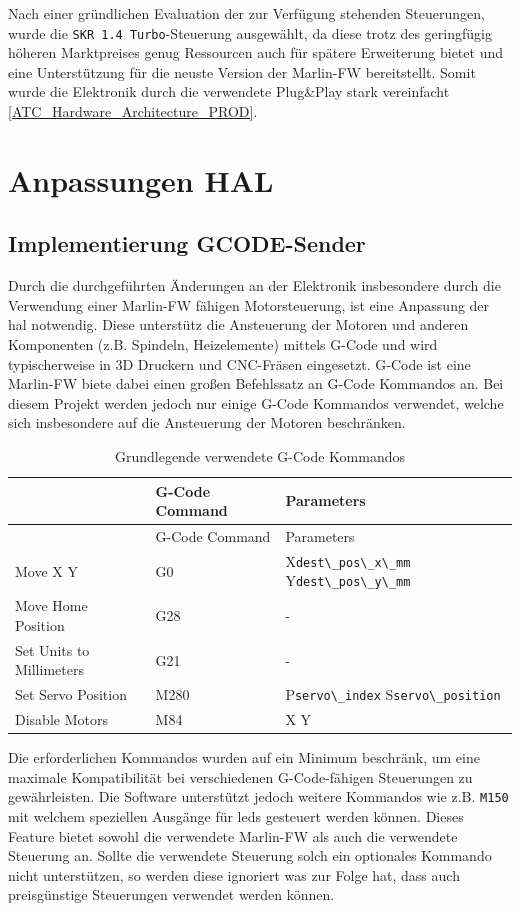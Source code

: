 Nach einer gründlichen Evaluation der zur Verfügung stehenden
Steuerungen, wurde die \passthrough{\lstinline!SKR 1.4 Turbo!}-Steuerung
ausgewählt, da diese trotz des geringfügig höheren Marktpreises genug
Ressourcen auch für spätere Erweiterung bietet und eine Unterstützung
für die neuste Version der Marlin-FW\cite{marlinfw} bereitstellt.
Somit wurde die Elektronik durch die verwendete Plug\&Play stark
vereinfacht \ref{ATC_Hardware_Architecture_PROD}.

\hypertarget{anpassungen-hal}{%
\section{Anpassungen HAL}\label{anpassungen-hal}}

\hypertarget{implementierung-gcode-sender}{%
\subsection{Implementierung
GCODE-Sender}\label{implementierung-gcode-sender}}

Durch die durchgeführten Änderungen an der Elektronik insbesondere durch
die Verwendung einer Marlin-FW\cite{marlinfw} fähigen
Motorsteuerung, ist eine Anpassung der \gls{hal} notwendig. Diese
unterstütz die Ansteuerung der Motoren und anderen Komponenten (z.B.
Spindeln, Heizelemente) mittels G-Code und wird typischerweise in 3D
Druckern und CNC-Fräsen eingesetzt. G-Code ist eine
Marlin-FW\cite{marlinfw} biete dabei einen großen Befehlssatz an
G-Code Kommandos an. Bei diesem Projekt werden jedoch nur einige G-Code
Kommandos verwendet, welche sich insbesondere auf die Ansteuerung der
Motoren beschränken.

\begin{longtable}[]{@{}lll@{}}
\caption{Grundlegende verwendete G-Code Kommandos}\tabularnewline
\toprule
& G-Code Command & Parameters\tabularnewline
\midrule
\endfirsthead
\toprule
& G-Code Command & Parameters\tabularnewline
\midrule
\endhead
Move X Y & G0 & X\passthrough{\lstinline!dest\_pos\_x\_mm!}
Y\passthrough{\lstinline!dest\_pos\_y\_mm!}\tabularnewline
Move Home Position & G28 & -\tabularnewline
Set Units to Millimeters & G21 & -\tabularnewline
Set Servo Position & M280 & P\passthrough{\lstinline!servo\_index!}
S\passthrough{\lstinline!servo\_position!}\tabularnewline
Disable Motors & M84 & X Y\tabularnewline
\bottomrule
\end{longtable}

Die erforderlichen Kommandos wurden auf ein Minimum beschränk, um eine
maximale Kompatibilität bei verschiedenen G-Code-fähigen Steuerungen zu
gewährleisten. Die Software unterstützt jedoch weitere Kommandos wie
z.B. \passthrough{\lstinline!M150!} mit welchem speziellen Ausgänge für
\gls{led}s gesteuert werden können. Dieses Feature bietet sowohl die
verwendete Marlin-FW\cite{marlinfw} als auch die verwendete
Steuerung an. Sollte die verwendete Steuerung solch ein optionales
Kommando nicht unterstützen, so werden diese ignoriert was zur Folge
hat, dass auch preisgünstige Steuerungen verwendet werden können.

